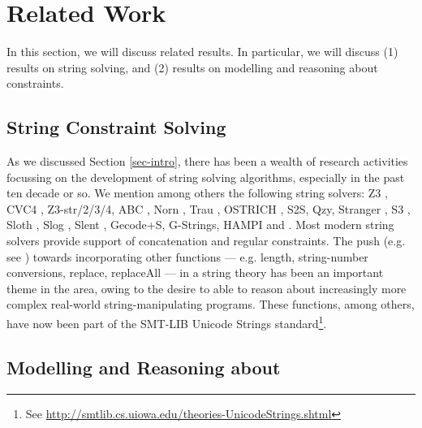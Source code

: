 \section{Related Work}
\label{sec-related}

In this section, we will discuss related results. In particular, we will discuss
(1) results on string solving, and (2) results on modelling and reasoning about 
\regexp{} constraints. 

\subsection{String Constraint Solving}
As we discussed Section \ref{sec-intro}, there has been a wealth of research
activities focussing on the development of string solving algorithms, especially
in the past ten decade or so. We mention among others the following string
solvers:
Z3 \cite{Z3}, CVC4 \cite{cvc4}, Z3-str/2/3/4, ABC \cite{ABC}, Norn
\cite{Abdulla14}, Trau \cite{Z3-trau,AbdullaACDHRR18-trau,Abdulla17}, OSTRICH
\cite{CHL+19}, S2S, Qzy, Stranger \cite{Stranger}, S3 \cite{S3}, Sloth
\cite{HJLRV18,AbdullaA+19},
Slog \cite{fang-yu-circuits}, Slent \cite{WC+18}, Gecode+S, G-Strings, HAMPI
and 
\cite{HAMPI}. %
Most modern string solvers provide support of concatenation and regular 
constraints. The push (e.g. see
\cite{GB16,Vijay-length,HAMPI,Berkeley-JavaScript,LB16,S3})
towards incorporating other functions --- e.g. length, 
string-number conversions, replace, replaceAll --- in a string theory has been an
important theme in the area, owing to the desire to able to reason 
about increasingly more complex real-world string-manipulating programs.
These functions, among others, have now been part of the SMT-LIB Unicode Strings
standard\footnote{See
\url{http://smtlib.cs.uiowa.edu/theories-UnicodeStrings.shtml}}. 

\subsection{Modelling and Reasoning about \regexp{}}

